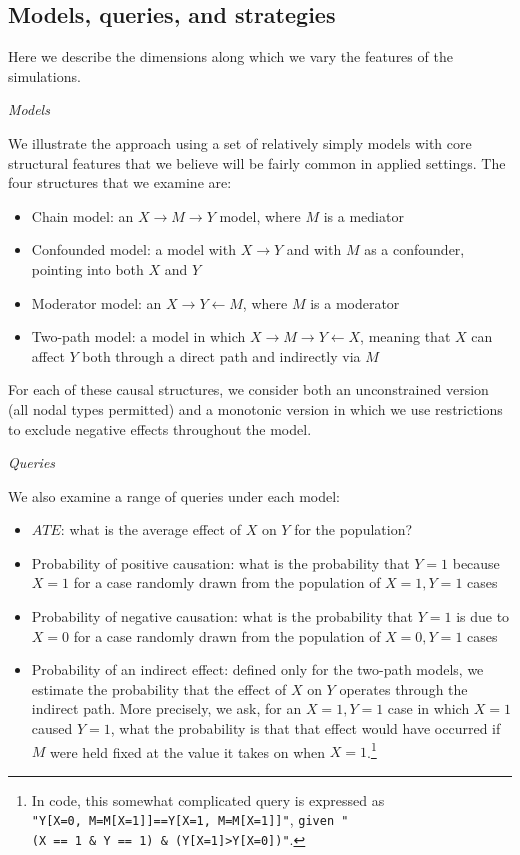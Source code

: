 \documentclass[
  12pt,
]{book}
\providecommand{\tightlist}{%
  \setlength{\itemsep}{0pt}\setlength{\parskip}{0pt}}
\begin{document}
\hypertarget{models-queries-and-strategies}{%
\subsection{Models, queries, and strategies}\label{models-queries-and-strategies}}

Here we describe the dimensions along which we vary the features of the simulations.

\emph{Models}

We illustrate the approach using a set of relatively simply models with core structural features that we believe will be fairly common in applied settings. The four structures that we examine are:

\begin{itemize}
\tightlist
\item
  Chain model: an \(X \rightarrow M \rightarrow Y\) model, where \(M\) is a mediator
\item
  Confounded model: a model with \(X \rightarrow Y\) and with \(M\) as a confounder, pointing into both \(X\) and \(Y\)
\item
  Moderator model: an \(X \rightarrow Y \leftarrow M\), where \(M\) is a moderator
\item
  Two-path model: a model in which \(X \rightarrow M \rightarrow Y \leftarrow X\), meaning that \(X\) can affect \(Y\) both through a direct path and indirectly via \(M\)
\end{itemize}

For each of these causal structures, we consider both an unconstrained version (all nodal types permitted) and a monotonic version in which we use restrictions to exclude negative effects throughout the model.

\emph{Queries}

We also examine a range of queries under each model:

\begin{itemize}
\tightlist
\item
  \(ATE\): what is the average effect of \(X\) on \(Y\) for the population?
\item
  Probability of positive causation: what is the probability that \(Y=1\) because \(X=1\) for a case randomly drawn from the population of \(X=1, Y=1\) cases
\item
  Probability of negative causation: what is the probability that \(Y=1\) is due to \(X=0\) for a case randomly drawn from the population of \(X=0, Y=1\) cases
\item
  Probability of an indirect effect: defined only for the two-path models, we estimate the probability that the effect of \(X\) on \(Y\) operates through the indirect path. More precisely, we ask, for an \(X=1, Y=1\) case in which \(X=1\) caused \(Y=1\), what the probability is that that effect would have occurred if \(M\) were held fixed at the value it takes on when \(X=1\).\footnote{In code, this somewhat complicated query is expressed as \texttt{"Y{[}X=0,\ M=M{[}X=1{]}{]}==Y{[}X=1,\ M=M{[}X=1{]}{]}"}, \texttt{given\ "(X\ ==\ 1\ \&\ Y\ ==\ 1)\ \&\ (Y{[}X=1{]}\textgreater{}Y{[}X=0{]})"}.}
\end{itemize}
\end{document}
